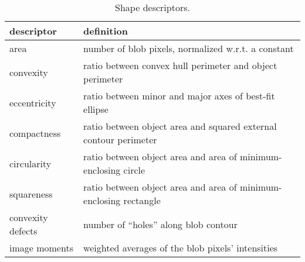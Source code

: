 \begin{table}
\caption{Shape descriptors.}
\label{tab:descriptors}
\centering
\begin{tabular}{lp{}}
\toprule
descriptor & definition \\
\midrule
area & number of blob pixels, normalized w.r.t. a constant \\
convexity & ratio between convex hull perimeter and object perimeter \\
eccentricity & ratio between minor and major axes of best-fit ellipse \\
compactness & ratio between object area and squared external contour perimeter \\
circularity & ratio between object area and area of minimum-enclosing circle \\
squareness & ratio between object area and area of minimum-enclosing rectangle \\
convexity defects & number of ``holes'' along blob contour \\
image moments & weighted averages of the blob pixels' intensities \\
\bottomrule
\end{tabular}
\end{table}

